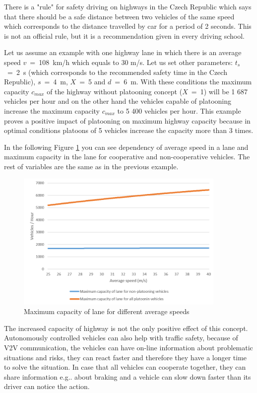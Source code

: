 There is a "rule" for safety driving on highways in the Czech Republic which says that there should be a safe distance between two vehicles of the same speed which corresponds to the distance travelled by car for a period of 2 seconds. This is not an official rule, but it is a recommendation given in every driving school.

Let us assume an example with one highway lane in which there is an average speed \mbox{$v$ = 108 km/h} which equals to 30 m/s. Let us set other parameters: \mbox{$t_{s}$  = 2 s} (which corresponds to the recommended safety time in the Czech Republic), \mbox{$s$ = 4 m}, \mbox{$X$ = 5} and \mbox{$d$ = 6 m}. With these conditions the maximum capacity  $c_{max}$   of the highway without platooning concept \mbox{($X$ = 1)} will be 1 687 vehicles per hour and on the other hand the vehicles capable of platooning increase the maximum capacity $c_{max}$ to 5 400 vehicles per hour. This example proves a positive impact of platooning on maximum highway capacity because in optimal conditions platoons of 5 vehicles increase the capacity more than 3 times.

In the following Figure \ref{fig:3_3-1} you can see dependency of average speed in a lane and maximum capacity in the lane for cooperative and non-cooperative vehicles. The rest of variables are the same as in the previous example.

\begin{figure}[!htbp]
\centering
\includegraphics[width=0.90\textwidth,height=0.90\textheight,keepaspectratio]{figures/Chapter_3/3_curve_nonXplatooning_vehicles.png}
\centering
\protect\caption{\label{fig:3_3-1}Maximum capacity of lane for different average speeds}
\end{figure}

The increased capacity of highway is not the only positive effect of this concept. Autonomously controlled vehicles can also help with traffic safety, because of V2V communication, the vehicles can have on-line information about problematic situations and risks, they can react faster and therefore they have a longer time to solve the situation. In case that all vehicles can cooperate together, they can share information  e.g.. about braking and a vehicle can slow down faster than its driver can notice the action.

